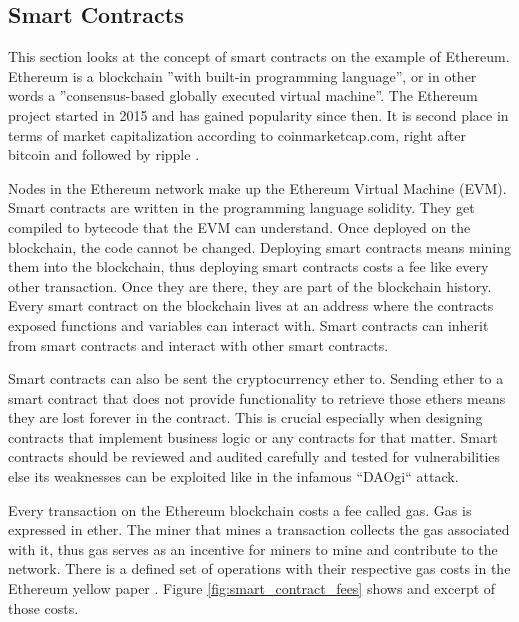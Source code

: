 \subsection{Smart Contracts}
\label{subsec:02_smart_contracts}

This section looks at the concept of smart contracts on the example of Ethereum.
Ethereum is a blockchain ''with built-in programming language'', or in other words a ''consensus-based globally executed virtual machine''.
The Ethereum project started in 2015 and has gained popularity since then. It is second place in terms of market capitalization according to coinmarketcap.com, right after bitcoin and followed by ripple \cite{coinmarketcap}.

Nodes in the Ethereum network make up the Ethereum Virtual Machine (EVM). Smart contracts are written in the programming language solidity. They get compiled to bytecode that the EVM can understand.
Once deployed on the blockchain, the code cannot be changed. Deploying smart contracts means mining them into the blockchain, thus deploying smart contracts costs a fee like every other transaction. Once they are there, they are part of the blockchain history. Every smart contract on the blockchain lives at an address where the contracts exposed functions and variables can interact with. Smart contracts can inherit from smart contracts and interact with other smart contracts.

Smart contracts can also be sent the cryptocurrency ether to. Sending ether to a smart contract that does not provide functionality to retrieve those ethers means they are lost forever in the contract. This is crucial especially when designing contracts that implement business logic or any contracts for that matter. Smart contracts should be reviewed and audited carefully and tested for vulnerabilities else its weaknesses can be exploited like in the infamous ``DAOgi`` attack.

Every transaction on the Ethereum blockchain costs a fee called gas. Gas is expressed in ether. The miner that mines a transaction collects the gas associated with it, thus gas serves as an incentive for miners to mine and contribute to the network. There is a defined set of operations with their respective gas costs in the Ethereum yellow paper \cite{ethereumyellowpaer}.
Figure \ref{fig:smart_contract_fees} shows and excerpt of those costs.

